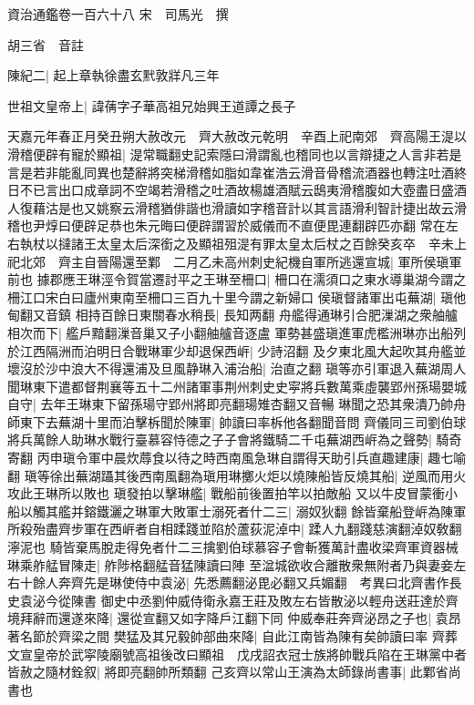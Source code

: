 資治通鑑卷一百六十八
宋　司馬光　撰

胡三省　音註

陳紀二|{
	起上章執徐盡玄黓敦牂凡三年}


世祖文皇帝上|{
	諱蒨字子華高祖兄始興王道譚之長子}


天嘉元年春正月癸丑朔大赦改元　齊大赦改元乾明　辛酉上祀南郊　齊高陽王湜以滑稽便辟有寵於顯祖|{
	湜常職翻史記索隱曰滑謂亂也稽同也以言辯捷之人言非若是言是若非能亂同異也楚辭將突梯滑稽如脂如韋崔浩云滑音骨稽流酒器也轉注吐酒終日不已言出口成章詞不空竭若滑稽之吐酒故楊雄酒賦云鴟夷滑稽腹如大壺盡日盛酒人復藉沽是也又姚察云滑稽猶俳諧也滑讀如字稽音計以其言語滑利智計捷出故云滑稽也尹焞曰便辟足恭也朱元晦曰便辟謂習於威儀而不直便毘連翻辟匹亦翻}
常在左右執杖以撻諸王太皇太后深銜之及顯祖殂湜有罪太皇太后杖之百餘癸亥卒　辛未上祀北郊　齊主自晉陽還至鄴　二月乙未高州刺史紀機自軍所逃還宣城|{
	軍所侯瑱軍前也}
據郡應王琳涇令賀當遷討平之王琳至柵口|{
	柵口在濡須口之東水導巢湖今謂之柵江口宋白曰廬州東南至柵口三百九十里今謂之新婦口}
侯瑱督諸軍出屯蕪湖|{
	瑱他甸翻又音鎮}
相持百餘日東關春水稍長|{
	長知两翻}
舟艦得通琳引合肥漅湖之衆舳艫相次而下|{
	艦戶黯翻漅音巢又子小翻舳艫音逐盧}
軍勢甚盛瑱進軍虎檻洲琳亦出船列於江西隔洲而泊明日合戰琳軍少却退保西㟁|{
	少詩沼翻}
及夕東北風大起吹其舟艦並壞沒於沙中浪大不得還浦及旦風静琳入浦治船|{
	治直之翻}
瑱等亦引軍退入蕪湖周人聞琳東下遣都督荆襄等五十二州諸軍事荆州刺史史寜將兵數萬乘虛襲郢州孫瑒嬰城自守|{
	去年王琳東下留孫瑒守郢州將即亮翻瑒雉杏翻又音暢}
琳聞之恐其衆潰乃帥舟師東下去蕪湖十里而泊擊柝聞於陳軍|{
	帥讀曰率柝他各翻聞音問}
齊儀同三司劉伯球將兵萬餘人助琳水戰行臺慕容恃德之子子會將鐵騎二千屯蕪湖西㟁為之聲勢|{
	騎奇寄翻}
丙申瑱令軍中晨炊蓐食以待之時西南風急琳自謂得天助引兵直趣建康|{
	趣七喻翻}
瑱等徐出蕪湖躡其後西南風翻為瑱用琳擲火炬以燒陳船皆反燒其船|{
	逆風而用火攻此王琳所以敗也}
瑱發拍以擊琳艦|{
	戰船前後置拍竿以拍敵船}
又以牛皮冒蒙衝小船以觸其艦并鎔鐵灑之琳軍大敗軍士溺死者什二三|{
	溺奴狄翻}
餘皆棄船登㟁為陳軍所殺殆盡齊步軍在西㟁者自相蹂踐並陷於蘆荻泥淖中|{
	蹂人九翻踐慈演翻淖奴敎翻濘泥也}
騎皆棄馬脫走得免者什二三擒劉伯球慕容子會斬獲萬計盡收梁齊軍資器械琳乘舴艋冒陳走|{
	舴陟格翻艋音猛陳讀曰陣}
至湓城欲收合離散衆無附者乃與妻妾左右十餘人奔齊先是琳使侍中袁泌|{
	先悉薦翻泌毘必翻又兵媚翻　考異曰北齊書作長史袁泌今從陳書}
御史中丞劉仲威侍衛永嘉王莊及敗左右皆散泌以輕舟送莊達於齊境拜辭而還遂來降|{
	還從宣翻又如字降戶江翻下同}
仲威奉莊奔齊泌昂之子也|{
	袁昂著名節於齊梁之間}
樊猛及其兄毅帥部曲來降|{
	自此江南皆為陳有矣帥讀曰率}
齊葬文宣皇帝於武寜陵廟號高祖後改曰顯祖　戊戌詔衣冠士族將帥戰兵陷在王琳黨中者皆赦之隨材銓叙|{
	將即亮翻帥所類翻}
己亥齊以常山王演為太師錄尚書事|{
	此鄴省尚書也}
